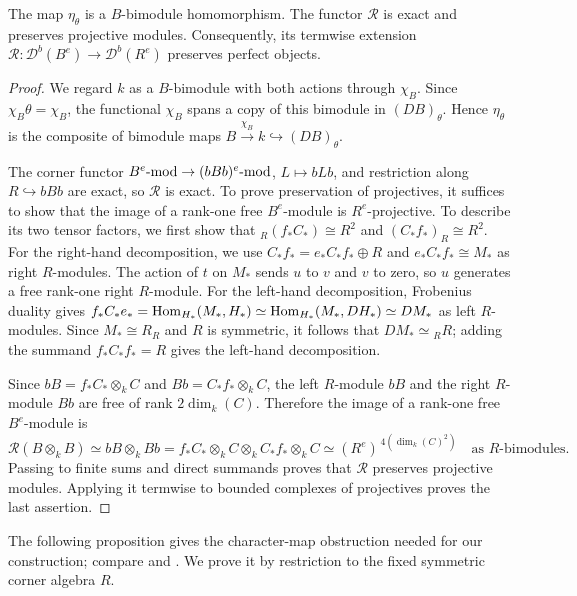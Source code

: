 \documentclass[11pt]{article}
\begin{document}
\begin{Lem}\label{lift:corner-preparation}
The map $\eta_\theta$ is a $B$-bimodule homomorphism.
The functor $\mathcal R$ is exact and preserves projective modules.
Consequently, its termwise extension $\mathcal R:\mathscr D^b(B^e)\to\mathscr D^b(R^e)$
preserves perfect objects.
\end{Lem}

\begin{proof}
We regard $k$ as a $B$-bimodule with both actions through
$\chi_B$. Since $\chi_B\theta=\chi_B$, the functional $\chi_B$
spans a copy of this bimodule in $(DB)_\theta$. Hence
$\eta_\theta$ is the composite of bimodule maps
$B\xrightarrow{\chi_B}k\hookrightarrow(DB)_\theta$.

The corner functor $B^e\mbox{{\rm -mod}}\to(bBb)^e\mbox{{\rm -mod}}$, $L\mapsto bLb$, and restriction along $R\hookrightarrow bBb$ are exact,
so $\mathcal R$ is exact. To prove preservation of projectives,
it suffices to show that the image of a rank-one free
$B^e$-module is $R^e$-projective. To describe its two tensor factors, we first show that
${}_R(f_*C_*)\cong R^2$ and $(C_*f_*)_R\cong R^2$.
For the right-hand decomposition, we use $C_*f_*=e_*C_*f_*\oplus R$ and
$e_*C_*f_*\cong M_*$ as right $R$-modules. The action of $t$ on
$M_*$ sends $u$ to $v$ and $v$ to zero, so $u$ generates a free
rank-one right $R$-module. For the left-hand decomposition, Frobenius duality gives
$f_*C_*e_*={\rm Hom}_{H_*}(M_*, H_*)\simeq {\rm Hom}_{H_*}(M_*, DH_*)\simeq DM_*$ as left $R$-modules.
Since $M_*\cong R_R$ and $R$ is symmetric, it follows that
$DM_*\simeq {}_R R$; adding the summand $f_*C_*f_*=R$ gives the
left-hand decomposition.

Since $bB=f_*C_*\otimes_kC$ and $Bb=C_*f_*\otimes_kC$, the left $R$-module $bB$ and the right $R$-module
$Bb$ are free of rank $2\dim_k(C)$. Therefore the image of a rank-one free $B^e$-module is
\[
 \mathcal R(B\otimes_k B)\simeq bB\otimes_k Bb=f_*C_*\otimes_kC\otimes_kC_*f_*\otimes_kC
 \simeq (R^e)^{\,4(\dim_k(C)^2)}
 \quad\text{as $R$-bimodules}.
\]
Passing to finite sums and direct summands proves that $\mathcal R$ preserves projective modules. Applying it termwise to bounded complexes of projectives proves the last assertion.
\end{proof}

The following proposition gives the character-map obstruction
needed for our construction; compare \cite[Lemma~6.5]{O} and
\cite[Proposition~5.3]{F}. We prove it by restriction to the fixed
symmetric corner algebra $R$.
\end{document}
